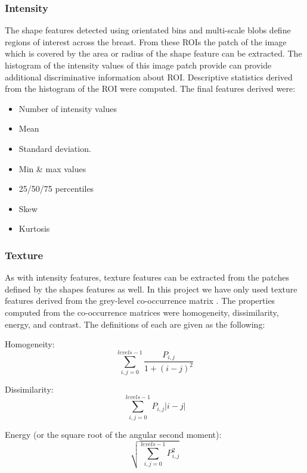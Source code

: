 \subsubsection{Intensity}
The shape features detected using orientated bins and multi-scale blobs define regions of interest across the breast. From these ROIs the patch of the image which is covered by the area or radius of the shape feature can be extracted. The histogram of the intensity values of this image patch provide can provide additional discriminative information about ROI. Descriptive statistics derived from the histogram of the ROI were computed. The final features derived were:

\begin{itemize}
	\item Number of intensity values
	\item Mean
	\item Standard deviation.
	\item Min \& max values
	\item 25/50/75 percentiles
	\item Skew
	\item Kurtosis
\end{itemize}

\subsubsection{Texture}
As with intensity features, texture features can be extracted from the patches defined by the shapes features as well. In this project we have only used texture features derived from the grey-level co-occurrence matrix \cite{haralick1973textural}. The properties computed from the co-occurrence matrices were homogeneity, dissimilarity, energy, and contrast. The definitions of each are given as the following:

Homogeneity:
\begin{equation}
	\sum\limits_{i,j=0}^{levels-1} \frac{P_{i,j}}{1+(i-j)^2}
\end{equation}

Dissimilarity:
\begin{equation}
	\sum\limits_{i,j=0}^{levels-1} P_{i,j}|i-j|
\end{equation}

Energy (or the square root of the angular second moment):
\begin{equation}
	\sqrt{ \sum\limits_{i,j=0}^{levels-1} P_{i,j}^2 }
\end{equation}

